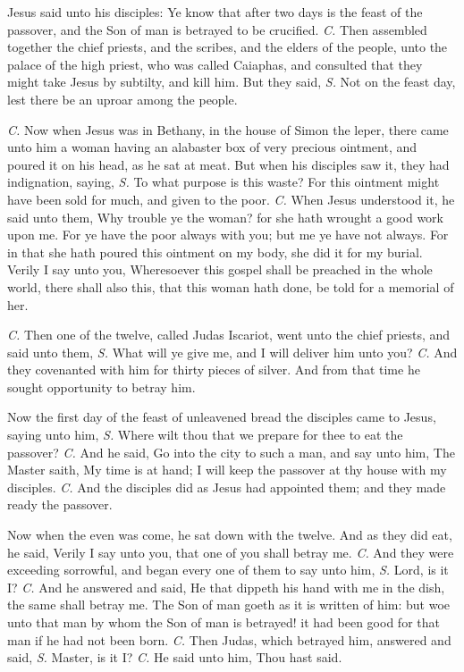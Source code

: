  Jesus said unto his disciples: {} Ye know that after two days is the feast of the passover, and the Son of man is betrayed to be crucified. \textit{C.} Then assembled together the chief priests, and the scribes, and the elders of the people, unto the palace of the high priest, who was called Caiaphas, and consulted that they might take Jesus by subtilty, and kill him. But they said, \textit{S.} Not on the feast day, lest there be an uproar among the people.

\textit{C.} Now when Jesus was in Bethany, in the house of Simon the leper, there came unto him a woman having an alabaster box of very precious ointment, and poured it on his head, as he sat at meat. But when his disciples saw it, they had indignation, saying, \textit{S.} To what purpose is this waste? For this ointment might have been sold for much, and given to the poor. \textit{C.} When Jesus understood it, he said unto them, {} Why trouble ye the woman? for she hath wrought a good work upon me. For ye have the poor always with you; but me ye have not always. For in that she hath poured this ointment on my body, she did it for my burial. Verily I say unto you, Wheresoever this gospel shall be preached in the whole world, there shall also this, that this woman hath done, be told for a memorial of her.

\textit{C.} Then one of the twelve, called Judas Iscariot, went unto the chief priests, and said unto them, \textit{S.} What will ye give me, and I will deliver him unto you? \textit{C.} And they covenanted with him for thirty pieces of silver. And from that time he sought opportunity to betray him.

Now the first day of the feast of unleavened bread the disciples came to Jesus, saying unto him, \textit{S.} Where wilt thou that we prepare for thee to eat the passover? \textit{C.} And he said, {} Go into the city to such a man, and say unto him, The Master saith, My time is at hand; I will keep the passover at thy house with my disciples. \textit{C.} And the disciples did as Jesus had appointed them; and they made ready the passover.

Now when the even was come, he sat down with the twelve. And as they did eat, he said, {} Verily I say unto you, that one of you shall betray me. \textit{C.} And they were exceeding sorrowful, and began every one of them to say unto him, \textit{S.} Lord, is it I? \textit{C.} And he answered and said, {} He that dippeth his hand with me in the dish, the same shall betray me. The Son of man goeth as it is written of him: but woe unto that man by whom the Son of man is betrayed! it had been good for that man if he had not been born. \textit{C.} Then Judas, which betrayed him, answered and said, \textit{S.} Master, is it I? \textit{C.} He said unto him, {} Thou hast said.

